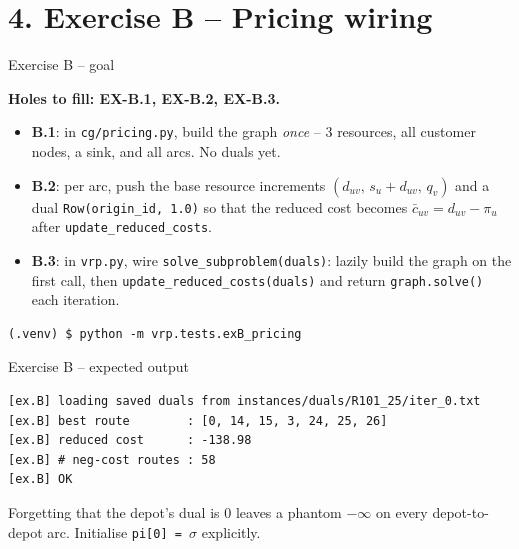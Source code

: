 \documentclass[10pt,aspectratio=169]{beamer}
\newcommand{\redcost}{\bar{c}}
\begin{document}
\section{4. Exercise B -- Pricing wiring}

\begin{frame}[fragile]{Exercise B -- goal}
  \begin{exbox}
    \textbf{Holes to fill: EX-B.1, EX-B.2, EX-B.3.}
    \begin{itemize}\small
      \item \textbf{B.1}: in \texttt{cg/pricing.py}, build the graph
            \emph{once} -- 3 resources, all customer nodes, a sink, and
            all arcs.  No duals yet.
      \item \textbf{B.2}: per arc, push the \alert{base} resource
            increments $(d_{uv},\, s_u\!+\!d_{uv},\, q_v)$ and a dual
            \texttt{Row(origin\_id, 1.0)} so that the reduced cost
            becomes $\redcost_{uv}\!=\!d_{uv}-\pi_{u}$ after
            \texttt{update\_reduced\_costs}.
      \item \textbf{B.3}: in \texttt{vrp.py}, wire
            \texttt{solve\_subproblem(duals)}: lazily build the graph on
            the first call, then \texttt{update\_reduced\_costs(duals)}
            and return \texttt{graph.solve()} each iteration.
    \end{itemize}
  \end{exbox}
  \medskip
\begin{lstlisting}[style=sh]
(.venv) $ python -m vrp.tests.exB_pricing
\end{lstlisting}
\end{frame}

\begin{frame}[fragile]{Exercise B -- expected output}
\begin{lstlisting}[style=sh]
[ex.B] loading saved duals from instances/duals/R101_25/iter_0.txt
[ex.B] best route        : [0, 14, 15, 3, 24, 25, 26]
[ex.B] reduced cost      : -138.98
[ex.B] # neg-cost routes : 58
[ex.B] OK
\end{lstlisting}
  \begin{warnbox}
    Forgetting that the depot's dual is $0$ leaves a phantom $-\infty$ on
    every depot-to-depot arc. Initialise \texttt{pi[0] = $\sigma$} explicitly.
  \end{warnbox}
\end{frame}
\end{document}
